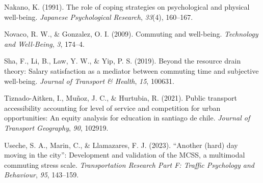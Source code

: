 \documentclass[
11pt, %
oneside, %
english, %
singlespacing, %
]{macthesis} %
\newlength{\cslhangindent}
\newenvironment{CSLReferences}[2] %
 {%
  \setlength{\parindent}{0pt}
  \ifodd #1 \everypar{\setlength{\hangindent}{\cslhangindent}}\ignorespaces\fi
  \ifnum #2 > 0
  \setlength{\parskip}{#2\baselineskip}
  \fi
 }%
 {}
\begin{document}
\begin{CSLReferences}{1}{0}
\leavevmode{}%
Nakano, K. (1991). The role of coping strategies on psychological and physical well-being. \emph{Japanese Psychological Research}, \emph{33}(4), 160--167.

\leavevmode{}%
Novaco, R. W., \& Gonzalez, O. I. (2009). Commuting and well-being. \emph{Technology and Well-Being}, \emph{3}, 174--4.

\leavevmode{}%
Sha, F., Li, B., Law, Y. W., \& Yip, P. S. (2019). Beyond the resource drain theory: Salary satisfaction as a mediator between commuting time and subjective well-being. \emph{Journal of Transport \& Health}, \emph{15}, 100631.

\leavevmode{}%
Tiznado-Aitken, I., Muñoz, J. C., \& Hurtubia, R. (2021). Public transport accessibility accounting for level of service and competition for urban opportunities: An equity analysis for education in santiago de chile. \emph{Journal of Transport Geography}, \emph{90}, 102919.

\leavevmode{}%
Useche, S. A., Marin, C., \& Llamazares, F. J. (2023). {``Another (hard) day moving in the city''}: Development and validation of the MCSS, a multimodal commuting stress scale. \emph{Transportation Research Part F: Traffic Psychology and Behaviour}, \emph{95}, 143--159.

\end{CSLReferences}
\end{document}
